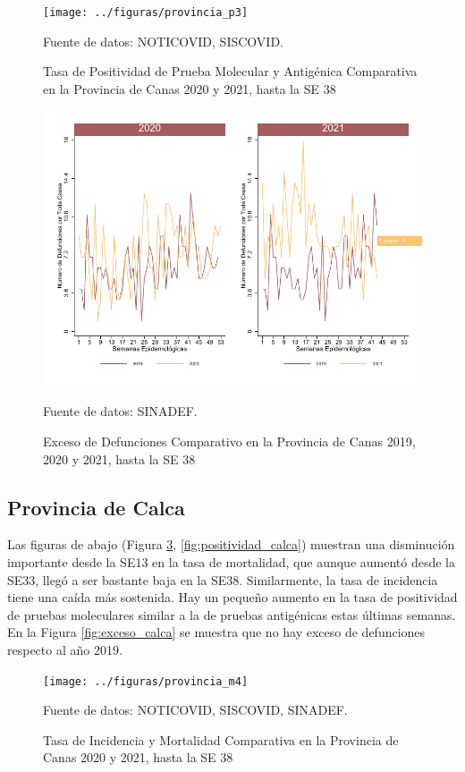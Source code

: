 \documentclass[12pt,a4paper,openany]{book}
\begin{document}
	\begin{figure}[h]
		\caption{Tasa de Positividad de Prueba Molecular y Antigénica Comparativa en la Provincia de Canas 2020 y 2021, hasta la SE 38}\label{fig:positividad_canas}
		\begin{center}
			\texttt{[image: ../figuras/provincia\_p3]}
		\end{center}
		{\footnotesize {Fuente de datos: NOTICOVID, SISCOVID.}}
	\end{figure}
	
	\begin{figure}[h]
		\caption{Exceso de Defunciones Comparativo en la Provincia de Canas 2019, 2020 y 2021, hasta la SE 38}\label{fig:exceso_canas}
		\begin{center}
			\includegraphics[width=0.7\linewidth]{../figuras/exceso_3}
		\end{center}
		{\footnotesize {Fuente de datos: SINADEF.}}
	\end{figure}

\clearpage

	\subsection*{Provincia de Calca}
	\noindent Las figuras de abajo (Figura \ref{fig:inc_mort_calca}, \ref{fig:positividad_calca})  muestran una disminución importante desde la SE13 en la tasa de mortalidad, que aunque aumentó desde la SE33, llegó a ser bastante baja en la SE38. Similarmente, la tasa de incidencia tiene una caída más sostenida. Hay un pequeño aumento en la tasa de positividad de pruebas moleculares similar a la de pruebas antigénicas estas últimas semanas. En la Figura \ref{fig:exceso_calca} se muestra que no hay exceso de defunciones respecto al año 2019.

	\begin{figure}[h]
	\caption{Tasa de Incidencia y Mortalidad Comparativa en la Provincia de Canas 2020 y 2021, hasta la SE 38}\label{fig:inc_mort_calca}
	\begin{center}
		\texttt{[image: ../figuras/provincia\_m4]}
	\end{center}
	{\footnotesize {Fuente de datos: NOTICOVID, SISCOVID, SINADEF.}}
	\end{figure}
\end{document}
